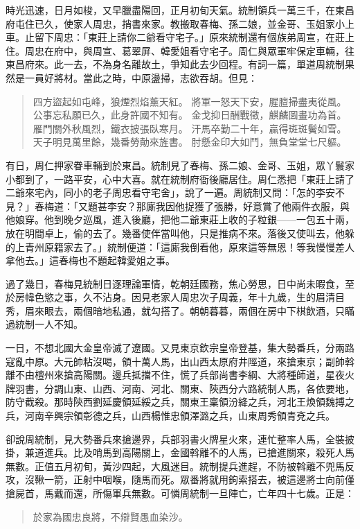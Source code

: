 時光迅速，日月如梭，又早臘盡陽回，正月初旬天氣。統制領兵一萬三千，在東昌府屯住已久，使家人周忠，捎書來家。教搬取春梅、孫二娘，並金哥、玉姐家小上車。止留下周忠：「東莊上請你二爺看守宅子。」原來統制還有個族弟周宣，在莊上住。周忠在府中，與周宣、葛翠屏、韓愛姐看守宅子。周仁與眾軍牢保定車輛，往東昌府來。此一去，不為身名離故土，爭知此去少回程。有詞一篇，單道周統制果然是一員好將材。當此之時，中原盪掃，志欲吞胡。但見：
\begin{quote}
四方盜起如屯峰，狼煙烈焰薰天紅。
將軍一怒天下安，腥膻掃盡夷從風。
公事忘私願已久，此身許國不知有。
金戈抑日酬戰徵，麒麟圖畫功為首。
雁門關外秋風烈，鐵衣披張臥寒月。
汗馬卒勤二十年，贏得斑斑鬢如雪。
天子明見萬里餘，幾番勞勣來旌書。
肘懸金印大如鬥，無負堂堂七尺軀。
\end{quote}

有日，周仁押家眷車輛到於東昌。統制見了春梅、孫二娘、金哥、玉姐，眾丫鬟家小都到了，一路平安，心中大喜。就在統制府衙後廳居住。周仁悉把「東莊上請了二爺來宅內，同小的老子周忠看守宅舍」，說了一遍。周統制又問：「怎的李安不見？」春梅道：「又題甚李安？那廝我因他捉獲了張勝，好意賞了他兩件衣服，與他娘穿。他到晚夕巡風，進入後廳，把他二爺東莊上收的子粒銀——一包五十兩，放在明間卓上，偷的去了。幾番使伴當叫他，只是推病不來。落後又使叫去，他躲的上青州原籍家去了。」統制便道：「這廝我倒看他，原來這等無恩！等我慢慢差人拿他去。」這春梅也不題起韓愛姐之事。

過了幾日，春梅見統制日逐理論軍情，乾朝廷國務，焦心勞思，日中尚未暇食，至於房幃色慾之事，久不沾身。因見老家人周忠次子周義，年十九歲，生的眉清目秀，眉來眼去，兩個暗地私通，就勾搭了。朝朝暮暮，兩個在房中下棋飲酒，只瞞過統制一人不知。

一日，不想北國大金皇帝滅了遼國。又見東京欽宗皇帝登基，集大勢番兵，分兩路寇亂中原。大元帥粘沒喝，領十萬人馬，出山西太原府井陘道，來搶東京；副帥斡離不由檀州來搶高陽關。邊兵抵擋不住，慌了兵部尚書李綱、大將種師道，星夜火牌羽書，分調山東、山西、河南、河北、關東、陝西分六路統制人馬，各依要地，防守截殺。那時陝西劉延慶領延綏之兵，關東王稟領汾絳之兵，河北王煥領魏搏之兵，河南辛興宗領彰德之兵，山西楊惟忠領澤潞之兵，山東周秀領青兗之兵。

卻說周統制，見大勢番兵來搶邊界，兵部羽書火牌星火來，連忙整率人馬，全裝披掛，兼道進兵。比及哨馬到高陽關上，金國斡離不的人馬，已搶進關來，殺死人馬無數。正值五月初旬，黃沙四起，大風迷目。統制提兵進趕，不防被斡離不兜馬反攻，沒鞦一箭，正射中咽喉，隨馬而死。眾番將就用鉤索搭去，被這邊將士向前僅搶屍首，馬戴而還，所傷軍兵無數。可憐周統制一旦陣亡，亡年四十七歲。正是：
\begin{quote}
於家為國忠良將，不辯賢愚血染沙。
\end{quote}

